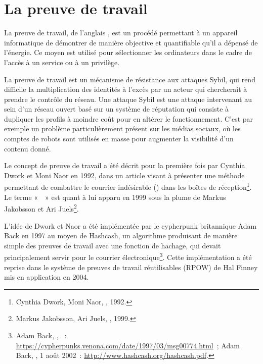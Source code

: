 
\section*{La preuve de travail}


La preuve de travail, de l'anglais , est un procédé permettant à un appareil informatique de démontrer de manière objective et quantifiable qu'il a dépensé de l'énergie. Ce moyen est utilisé pour sélectionner les ordinateurs dans le cadre de l'accès à un service ou à un privilège.

La preuve de travail est un mécanisme de résistance aux attaques Sybil, qui rend difficile la multiplication des identités à l'excès par un acteur qui chercherait à prendre le contrôle du réseau. Une attaque Sybil est une attaque intervenant au sein d'un réseau ouvert basé sur un système de réputation qui consiste à dupliquer les profils à moindre coût pour en altérer le fonctionnement. C'est par exemple un problème particulièrement présent sur les médias sociaux, où les comptes de robots sont utilisés en masse pour augmenter la visibilité d'un contenu donné. %

Le concept de preuve de travail a été décrit pour la première fois par Cynthia Dwork et Moni Naor en 1992, dans un article visant à présenter une méthode permettant de combattre le courrier indésirable () dans les boîtes de réception\footnote{Cynthia Dwork, Moni Naor, , 1992.}. Le terme «~~» est quant à lui apparu en 1999 sous la plume de Markus Jakobsson et Ari Juels\footnote{Markus Jakobsson, Ari Juels, , 1999.}.

L'idée de Dwork et Naor a été implémentée par le cypherpunk britannique Adam Back en 1997 au moyen de Hashcash, un algorithme produisant de manière simple des preuves de travail avec une fonction de hachage, qui devait principalement servir pour le courrier électronique\footnote{Adam Back, , ~: \url{https://cypherpunks.venona.com/date/1997/03/msg00774.html}~; Adam Back, , 1\ier{} août 2002~: \url{http://www.hashcash.org/hashcash.pdf}.}. Cette implémentation a été reprise dans le système de preuves de travail réutilisables (RPOW) de Hal Finney mis en application en 2004. %

